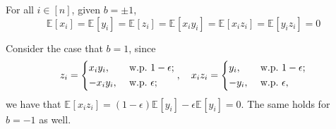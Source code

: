 \begin{claim}
	For all \(i\in [n]\), given \(b = \pm 1\),
	\[
		\mathbb{E}_{}\left[x_i \right]
		= \mathbb{E}_{}\left[y_i \right]
		= \mathbb{E}_{}\left[z_i \right]
		= \mathbb{E}_{}\left[x_i y_i \right]
		= \mathbb{E}_{}\left[x_i z_i \right]
		= \mathbb{E}_{}\left[y_i z_i \right]
		= 0
	\]
\end{claim}
\begin{explanation}
	Consider the case that \(b = 1\), since
	\[
		z_i = \begin{dcases}
			x_i y_i,  & \text{ w.p.\ } 1-\epsilon  ; \\
			-x_i y_i, & \text{ w.p.\ } \epsilon  ;
		\end{dcases},\quad x_i z_i = \begin{dcases}
			y_i,  & \text{ w.p.\ } 1-\epsilon  ; \\
			-y_i, & \text{ w.p.\ } \epsilon  ,
		\end{dcases}
	\]
	we have that \(\mathbb{E}_{}\left[x_i z_i \right] = (1 - \epsilon ) \mathbb{E}_{}\left[y_i \right] - \epsilon \mathbb{E}_{}\left[y_i \right] = 0\). The same holds for \(b = -1\) as well.
\end{explanation}

